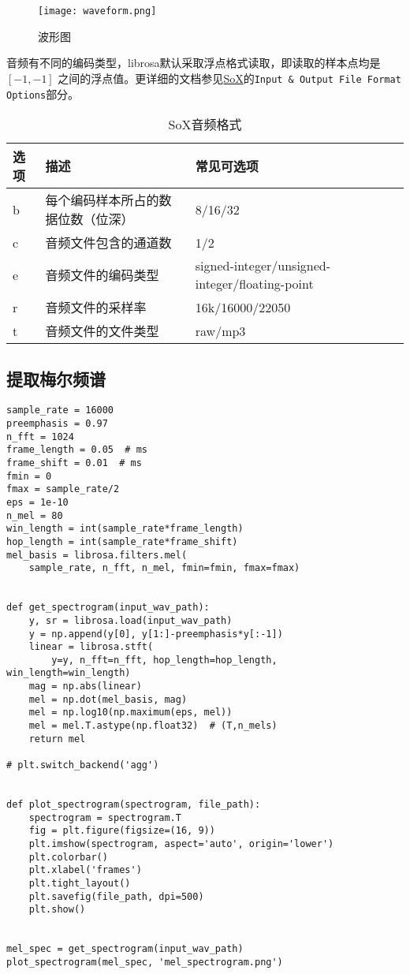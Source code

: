 \documentclass[cn,10pt,math=newtx,citestyle=gb7714-2015,bibstyle=gb7714-2015]{elegantbook}
\begin{document}
\begin{figure}[htbp]
  \centering
  \texttt{[image: waveform.png]}
  \caption{波形图 \label{fig:waveform}}
\end{figure}


音频有不同的编码类型，librosa默认采取浮点格式读取，即读取的样本点均是 $[-1,-1]$ 之间的浮点值。更详细的文档参见\href{http://sox.sourceforge.net/sox.html}{SoX}的\lstinline{Input & Output File Format Options}部分。

\begin{table}[htbp]
  \centering
  \caption{SoX音频格式}
    \begin{tabular}{llll}
    \toprule
    选项 & 描述 & 常见可选项 \\
    \midrule
    b & 每个编码样本所占的数据位数（位深） & 8/16/32 \\
    c & 音频文件包含的通道数 & 1/2 \\
    e & 音频文件的编码类型 & signed-integer/unsigned-integer/floating-point \\
    r & 音频文件的采样率 & 16k/16000/22050 \\
    t & 音频文件的文件类型 & raw/mp3 \\
    \bottomrule
    \end{tabular}%
\end{table}%

\subsection{提取梅尔频谱}

\begin{lstlisting}
sample_rate = 16000
preemphasis = 0.97
n_fft = 1024
frame_length = 0.05  # ms
frame_shift = 0.01  # ms
fmin = 0
fmax = sample_rate/2
eps = 1e-10
n_mel = 80
win_length = int(sample_rate*frame_length)
hop_length = int(sample_rate*frame_shift)
mel_basis = librosa.filters.mel(
    sample_rate, n_fft, n_mel, fmin=fmin, fmax=fmax)


def get_spectrogram(input_wav_path):
    y, sr = librosa.load(input_wav_path)
    y = np.append(y[0], y[1:]-preemphasis*y[:-1])
    linear = librosa.stft(
        y=y, n_fft=n_fft, hop_length=hop_length, win_length=win_length)
    mag = np.abs(linear)
    mel = np.dot(mel_basis, mag)
    mel = np.log10(np.maximum(eps, mel))
    mel = mel.T.astype(np.float32)  # (T,n_mels)
    return mel

# plt.switch_backend('agg')


def plot_spectrogram(spectrogram, file_path):
    spectrogram = spectrogram.T
    fig = plt.figure(figsize=(16, 9))
    plt.imshow(spectrogram, aspect='auto', origin='lower')
    plt.colorbar()
    plt.xlabel('frames')
    plt.tight_layout()
    plt.savefig(file_path, dpi=500)
    plt.show()


mel_spec = get_spectrogram(input_wav_path)
plot_spectrogram(mel_spec, 'mel_spectrogram.png')
\end{lstlisting}
\end{document}
